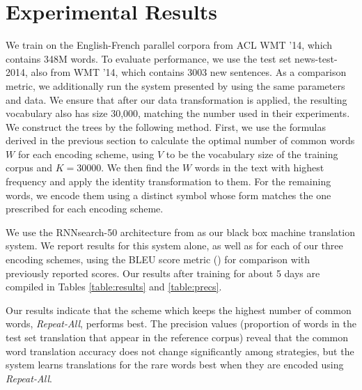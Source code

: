 \section{Experimental Results}
\label{sec:exp}

We train on the English-French parallel corpora from ACL WMT '14, which contains
348M words. To evaluate performance, we use the test set news-test-2014, also from
WMT '14, which contains 3003 new sentences. As a comparison metric, we additionally run the system presented by
 using the same parameters and data. We ensure
that after our data transformation is applied, the resulting vocabulary also has size
30,000, matching the number used in their experiments. We construct the trees by the following method. First, we use
the formulas derived in the previous section to calculate the optimal number of
common words $W$ for each encoding scheme, using $V$ to be the vocabulary size of the training corpus and $K = 30000$.
We then find the $W$ words in the text with highest frequency and
apply the identity transformation to them. For the remaining words, we encode them
using a distinct symbol whose form matches the one prescribed for each
encoding scheme.

We use the RNNsearch-50 architecture from  as
our black box machine translation system. We report results for this system alone,
as well as for each of our three encoding schemes, using the BLEU score metric () for
comparison with previously reported scores. Our results after training
for about 5 days are compiled in Tables \ref{table:results} and \ref{table:precs}.

Our results indicate that the scheme which keeps the highest number of common words, \emph{Repeat-All},
performs best. The precision values (proportion of words in the test set translation that appear in the
reference corpus) reveal that the common word translation accuracy does not change significantly
among strategies, but the system learns translations for the rare words best when they are encoded
using \emph{Repeat-All}.

\begin{table}
  \centering
  \vspace{8pt}
  \caption{BLEU scores on detokenized test set for various encoding
    schemes after training for 5 days.}
  \label{table:results}
\end{table}

